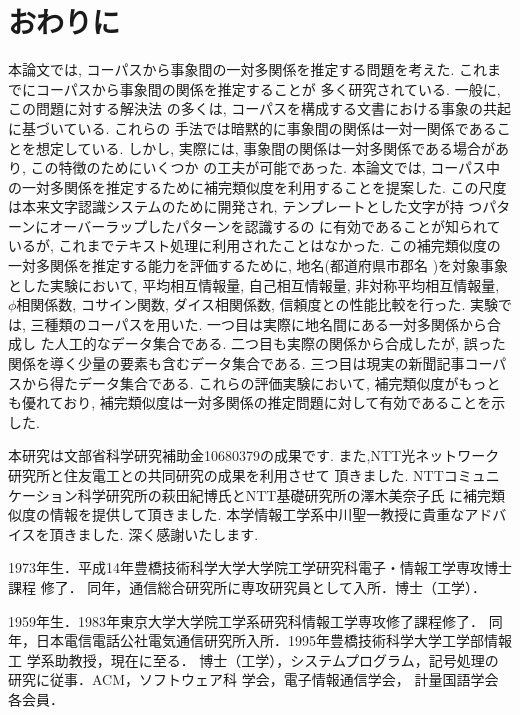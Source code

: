 \section{おわりに}
本論文では, コーパスから事象間の一対多関係を推定する問題を考えた. 
これまでにコーパスから事象間の関係を推定することが
多く研究されている. 一般に, この問題に対する解決法
の多くは, コーパスを構成する文書における事象の共起に基づいている. これらの
手法では暗黙的に事象間の関係は一対一関係であることを想定している. 
しかし, 実際には, 事象間の関係は一対多関係である場合があり, この特徴のためにいくつか
の工夫が可能であった. 
本論文では, コーパス中の一対多関係を推定するために補完類似度を利用することを提案した. 
この尺度は本来文字認識システムのために開発され, テンプレートとした文字が持
つパターンにオーバーラップしたパターンを認識するの
に有効であることが知られているが, これまでテキスト処理に利用されたことはなかった. 
この補完類似度の一対多関係を推定する能力を評価するために, 地名(都道府県市郡名
)を対象事象とした実験において, 
平均相互情報量, 自己相互情報量, 非対称平均相互情報量, $\phi$相関係数, 
コサイン関数, ダイス相関係数, 信頼度との性能比較を行った. 
実験では, 三種類のコーパスを用いた. 一つ目は実際に地名間にある一対多関係から合成し
た人工的なデータ集合である. 二つ目も実際の関係から合成したが, 
誤った関係を導く少量の要素も含むデータ集合である. 
三つ目は現実の新聞記事コーパスから得たデータ集合である. 
これらの評価実験において, 補完類似度がもっとも優れており, 
補完類似度は一対多関係の推定問題に対して有効であることを示した. 

\begin{acknowledgment}
本研究は文部省科学研究補助金10680379の成果です.
また,NTT光ネットワーク研究所と住友電工との共同研究の成果を利用させて
頂きました.
NTTコミュニケーション科学研究所の萩田紀博氏とNTT基礎研究所の澤木美奈子氏
に補完類似度の情報を提供して頂きました.
本学情報工学系中川聖一教授に貴重なアドバイスを頂きました.
深く感謝いたします.
\end{acknowledgment}






\begin{biography}
{
1973年生．平成14年豊橋技術科学大学大学院工学研究科電子・情報工学専攻博士課程
修了．
同年，通信総合研究所に専攻研究員として入所．博士（工学）．
}

{
1959年生．1983年東京大学大学院工学系研究科情報工学専攻修了課程修了．
同年，日本電信電話公社電気通信研究所入所．1995年豊橋技術科学大学工学部情報工
学系助教授，現在に至る．
博士（工学），システムプログラム，記号処理の研究に従事．ACM，ソフトウェア科
学会，電子情報通信学会，
計量国語学会各会員．
}


\end{biography}






